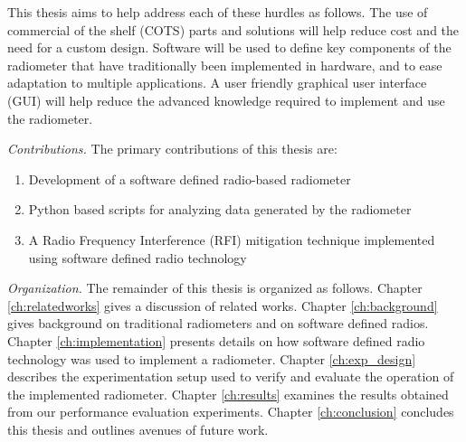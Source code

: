 This thesis aims to help address each of these hurdles as follows.  The use of commercial of the shelf (COTS) parts and solutions will help reduce cost and the need for a custom design.  Software will be used to define key components of the radiometer that have traditionally been implemented in hardware, and to ease adaptation to multiple applications.  A user friendly graphical user interface (GUI) will help reduce the advanced knowledge required to implement and use the radiometer. 

\emph{Contributions.}  The primary contributions of this thesis are:

\begin{enumerate}
\item Development of a software defined radio-based radiometer
\item Python based scripts for analyzing data generated by the radiometer
\item A Radio Frequency Interference (RFI) mitigation technique implemented using software defined radio technology
\end{enumerate}

\emph{Organization.}  The remainder of this thesis is organized as follows.  Chapter \ref{ch:relatedworks} gives a discussion of related works.  Chapter \ref{ch:background} gives background on traditional radiometers and on software defined radios.  Chapter \ref{ch:implementation} presents details on how software defined radio technology was used to implement a radiometer.  Chapter \ref{ch:exp_design} describes the experimentation setup used to verify and evaluate the operation of the implemented radiometer.  Chapter \ref{ch:results} examines the results obtained from our performance evaluation experiments.  Chapter \ref{ch:conclusion} concludes this thesis and outlines avenues of future work.

